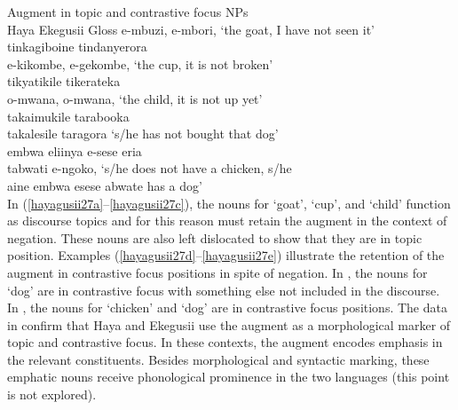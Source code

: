 \documentclass[output=paper]{langscibook}
\begin{document}
\ea Augment in topic and contrastive focus NPs\smallskip\\
\label{hayagusii27}
 \hphantom{abc }Haya				\hphantom{ia eliinya}\hspace{1ex}Ekegusii		\hphantom{-ngoko,i}Gloss
  \ea\label{hayagusii27a}	\gll e-mbuzi,		e-mbori,  	{‘the goat, I have not seen it’}\\
                              tinkagiboine\hphantom{ta}\hspace{1ex} tindanyerora\hphantom{oko} {}\\
  \ex\label{hayagusii27b}	\gll e-kikombe, 		e-gekombe,\hphantom{goko}  	{‘the cup, it is not broken’}\\
                              tikyatikile\hphantom{inya}\hspace{1ex} tikerateka {}\\
  \ex\label{hayagusii27c}	\gll o-mwana, 		o-mwana,  	{‘the child, it is not up yet’}\\
                              takaimukile\hphantom{ya}\hspace{1ex} tarabooka\hphantom{ingoko} {}\\
  \ex\label{hayagusii27d}	\gll takalesile  	taragora  	‘s/he has not bought that dog’\\
                                {embwa eliinya\hspace{1ex}} {e-sese	 eria}\hphantom{ngoko} {}\\
  \ex\label{hayagusii27e}	\hphantom{a}\hspace{1ex} 	{tabwati e-ngoko,} 	{‘s/he does not have a chicken, s/he}\\
                                        {aine embwa}         {esese abwate}               {has a dog’}\\
 \z
\z
In (\ref{hayagusii27a}--\ref{hayagusii27c}), the nouns for ‘goat’, ‘cup’, and ‘child’ function as discourse topics and for this reason must retain the augment in the context of negation. These nouns are also left dislocated to show that they are in topic position. Examples (\ref{hayagusii27d}--\ref{hayagusii27e}) illustrate the retention of the augment in contrastive focus positions in spite of negation. In , the nouns for ‘dog’ are in contrastive focus with something else not included in the discourse. In , the nouns for ‘chicken’ and ‘dog’ are in contrastive focus positions. The data in  confirm that Haya and Ekegusii use the augment as a morphological marker of topic and contrastive focus. In these contexts, the augment encodes emphasis in the relevant constituents. Besides morphological and syntactic marking, these emphatic nouns receive phonological prominence in the two languages (this point is not explored).
\end{document}
